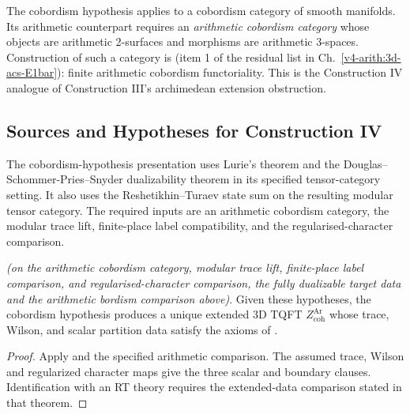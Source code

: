 \begin{remark}
\label{v4-arith:w10-a:rem:arith-cobord}
The cobordism hypothesis applies to a cobordism category
of smooth manifolds. Its arithmetic counterpart requires an
\emph{arithmetic cobordism category} whose objects are
arithmetic 2-surfaces and morphisms are arithmetic 3-spaces.
Construction of such a category is 
(item 1 of the residual list in Ch.~\ref{v4-arith:3d-acs-E1bar}):
finite arithmetic cobordism functoriality. This is the Construction IV
analogue of Construction III's archimedean extension obstruction.
\end{remark}

\subsection{Sources and Hypotheses for Construction IV}
\label{v4-arith:w10-a:ah:construction-IV}

The cobordism-hypothesis presentation uses Lurie's theorem and the
Douglas--Schommer-Pries--Snyder dualizability theorem in its
specified tensor-category setting. It also uses the Reshetikhin--Turaev state sum on
the resulting modular tensor category. The required inputs are an
arithmetic cobordism category, the modular trace lift, finite-place
label compatibility, and the regularised-character comparison.

\begin{theorem}
\label{v4-arith:w10-a:thm:construction-IV-closure}
\ClaimStatusProvedHereConditional \emph{(on the arithmetic cobordism
category, modular trace lift, finite-place label comparison, and
regularised-character comparison, the fully dualizable target data
and the arithmetic bordism comparison above)}. Given these hypotheses, the
cobordism hypothesis produces a unique extended 3D TQFT
\(Z_{\mathrm{coh}}^{\mathrm{Ar}}\) whose trace, Wilson, and scalar
partition data satisfy the axioms of
.
\end{theorem}

\begin{proof}
Apply  and the specified
arithmetic comparison. The assumed trace, Wilson and regularized
character maps give the three scalar and boundary clauses.
Identification with an RT theory requires the extended-data
comparison stated in that theorem.
\end{proof}

